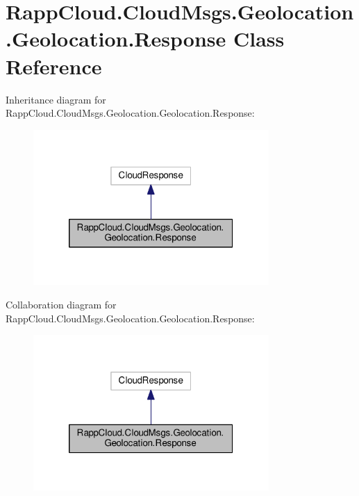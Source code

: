 \hypertarget{classRappCloud_1_1CloudMsgs_1_1Geolocation_1_1Geolocation_1_1Response}{\section{Rapp\-Cloud.\-Cloud\-Msgs.\-Geolocation.\-Geolocation.\-Response Class Reference}
\label{classRappCloud_1_1CloudMsgs_1_1Geolocation_1_1Geolocation_1_1Response}
}


Inheritance diagram for Rapp\-Cloud.\-Cloud\-Msgs.\-Geolocation.\-Geolocation.\-Response\-:
\nopagebreak
\begin{figure}[H]
\begin{center}
\leavevmode
\includegraphics[width=254pt]{classRappCloud_1_1CloudMsgs_1_1Geolocation_1_1Geolocation_1_1Response__inherit__graph}
\end{center}
\end{figure}


Collaboration diagram for Rapp\-Cloud.\-Cloud\-Msgs.\-Geolocation.\-Geolocation.\-Response\-:
\nopagebreak
\begin{figure}[H]
\begin{center}
\leavevmode
\includegraphics[width=254pt]{classRappCloud_1_1CloudMsgs_1_1Geolocation_1_1Geolocation_1_1Response__coll__graph}
\end{center}
\end{figure}
